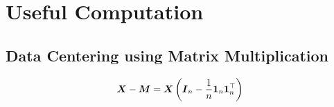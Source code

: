 
\chapter{Useful Computation} %
\label{cha:useful_computation}

\section{Data Centering using Matrix Multiplication} %
\label{sub:data_centering_using_matrix_multiplication}

\[
	{\boldsymbol{{X}}}- {\boldsymbol{{M}}} = {\boldsymbol{{X}}}\left( {\boldsymbol{{I}}}_n - \frac{1}{n} {\boldsymbol{{1}}}_n {\boldsymbol{{1}}}_n ^\top  \right)
\]

